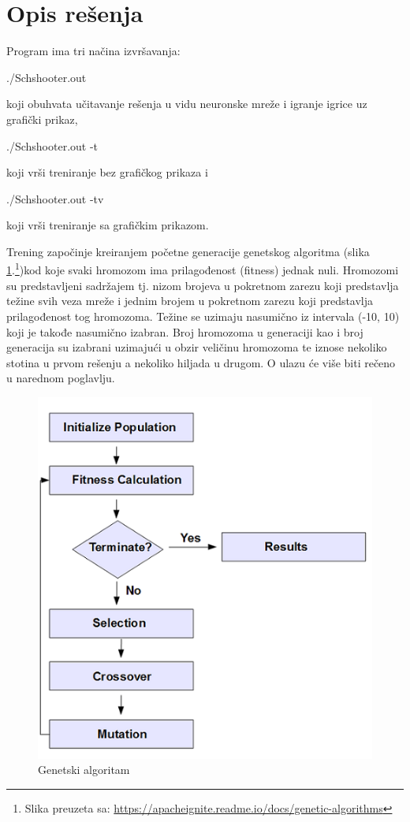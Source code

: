 \documentclass[a4paper]{article}
\begin{document}
\section{Opis rešenja}
\label{sec:opisResenja}
\par Program ima tri načina izvršavanja:
\begin{tcolorbox}
./Schshooter.out
\end{tcolorbox}
koji obuhvata učitavanje rešenja u vidu neuronske mreže i igranje igrice uz grafički prikaz,
\begin{tcolorbox}
./Schshooter.out -t
\end{tcolorbox}
koji vrši treniranje bez grafičkog prikaza i
\begin{tcolorbox}
./Schshooter.out -tv
\end{tcolorbox}
koji vrši treniranje sa grafičkim prikazom.

\newpage
\par Trening započinje kreiranjem početne generacije genetskog algoritma\cite{genetic} (slika \ref{fig:genetic}.\footnote{Slika preuzeta sa: \url{https://apacheignite.readme.io/docs/genetic-algorithms}})kod koje svaki hromozom ima prilagođenost (fitness) jednak nuli. Hromozomi su predstavljeni sadržajem tj. nizom brojeva u pokretnom zarezu koji predstavlja težine svih veza mreže i jednim brojem u pokretnom zarezu koji predstavlja prilagođenost tog hromozoma. Težine se uzimaju nasumično iz intervala (-10, 10) koji je takođe nasumično izabran. Broj hromozoma u generaciji kao i broj generacija su izabrani uzimajući u obzir veličinu hromozoma te iznose nekoliko stotina u prvom rešenju a nekoliko hiljada u drugom. O ulazu će više biti rečeno u narednom poglavlju.

\begin{figure}[h!]
	\begin{center}
		\includegraphics[scale=0.7]{genetic.png}
	\end{center}
	\caption{Genetski algoritam}
	\label{fig:genetic}
\end{figure}
\end{document}
